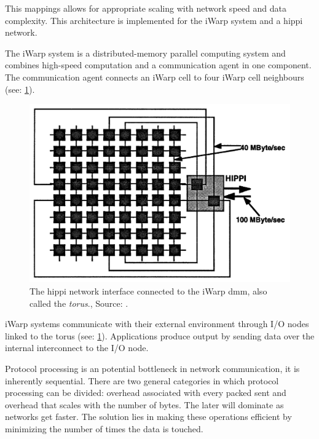 This mappings allows for appropriate scaling with network speed and data complexity.
This architecture is implemented for the iWarp system and a \ac{hippi} network.

The iWarp system is a distributed-memory parallel computing system and combines high-speed computation and a communication agent in one component.
The communication agent connects an iWarp cell to four iWarp cell neighbours (see: \cref{fig:rep4:torus}).

\begin{figure}
    \centering
	\includegraphics[width=0.95\linewidth]{Figures/Rep4torus.png}
	\caption{The \ac{hippi} network interface connected to the iWarp \ac{dmm}, also called the \textit{torus}., Source: \cite{steenkiste1997high}.} 
    \label{fig:rep4:torus}
\end{figure}

iWarp systems communicate with their external environment through I/O nodes linked to the torus (see: \cref{fig:rep4:torus}).
Applications produce output by sending data over the internal interconnect to the I/O node.

Protocol processing is an potential bottleneck in network communication, it is inherently sequential.
There are two general categories in which protocol processing can be divided: overhead associated with every packed sent and overhead that scales with the number of bytes.
The later will dominate as networks get faster.
The solution lies in making these operations efficient by minimizing the number of times the data is touched.

